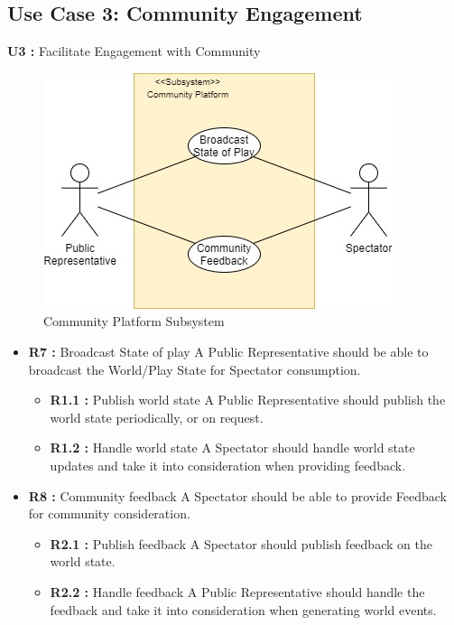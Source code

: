 \subsection{Use  Case 3: Community Engagement}
\textbf{U3 :} Facilitate Engagement with Community
\begin{figure}[h!]
\centering
\includegraphics[scale=0.75]{images/CommunityEngagement.jpg}
\caption{Community Platform Subsystem}
\label{fig:CommunityEngagement}
\end{figure}

\begin{itemize}
\item \textbf{R7 :} Broadcast State of play 
\newline
A Public Representative should be able to broadcast the World/Play State for Spectator consumption.
\begin{itemize}
\item \textbf{R1.1 :} Publish world state
\newline
A Public Representative should publish the world state periodically, or on request.
\item \textbf{R1.2 :} Handle world state
\newline
A Spectator should handle world state updates and take it into consideration when providing feedback.
\end{itemize}
\item \textbf{R8 :} Community feedback
\newline
A Spectator should be able to provide Feedback for community consideration.
\begin{itemize}
\item \textbf{R2.1 :} Publish feedback
\newline
A Spectator should publish feedback on the world state.
\item \textbf{R2.2 :} Handle feedback
\newline
A Public Representative should handle the feedback and take it into consideration when generating world events.
\end{itemize}
\end{itemize}

